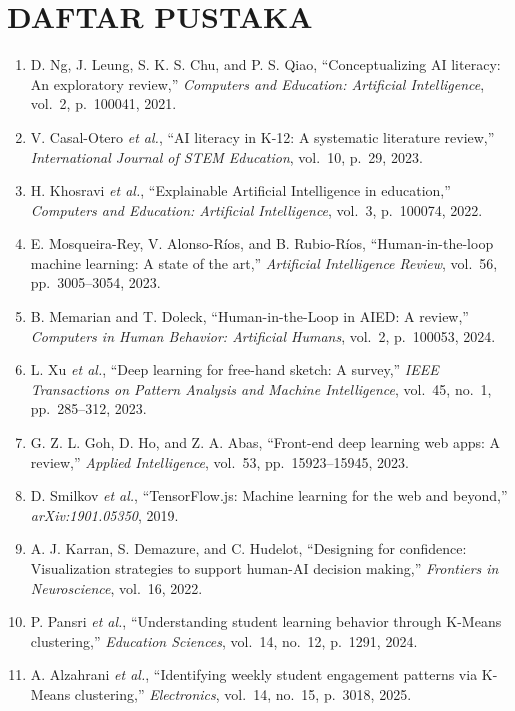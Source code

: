 \documentclass[10pt,twoside,openright]{report}
\begin{document}
\chapter*{DAFTAR PUSTAKA}

\begin{enumerate}
    \item[{[1]}] D. Ng, J. Leung, S. K. S. Chu, and P. S. Qiao, ``Conceptualizing AI literacy: An exploratory review,'' \textit{Computers and Education: Artificial Intelligence}, vol.~2, p.~100041, 2021.
    \item[{[2]}] V. Casal-Otero \textit{et al.}, ``AI literacy in K-12: A systematic literature review,'' \textit{International Journal of STEM Education}, vol.~10, p.~29, 2023.
    \item[{[3]}] H. Khosravi \textit{et al.}, ``Explainable Artificial Intelligence in education,'' \textit{Computers and Education: Artificial Intelligence}, vol.~3, p.~100074, 2022.
    \item[{[4]}] E. Mosqueira-Rey, V. Alonso-Ríos, and B. Rubio-Ríos, ``Human-in-the-loop machine learning: A state of the art,'' \textit{Artificial Intelligence Review}, vol.~56, pp.~3005--3054, 2023.
    \item[{[5]}] B. Memarian and T. Doleck, ``Human-in-the-Loop in AIED: A review,'' \textit{Computers in Human Behavior: Artificial Humans}, vol.~2, p.~100053, 2024.
    \item[{[6]}] L. Xu \textit{et al.}, ``Deep learning for free-hand sketch: A survey,'' \textit{IEEE Transactions on Pattern Analysis and Machine Intelligence}, vol.~45, no.~1, pp.~285--312, 2023.
    \item[{[7]}] G. Z. L. Goh, D. Ho, and Z. A. Abas, ``Front-end deep learning web apps: A review,'' \textit{Applied Intelligence}, vol.~53, pp.~15923--15945, 2023.
    \item[{[8]}] D. Smilkov \textit{et al.}, ``TensorFlow.js: Machine learning for the web and beyond,'' \textit{arXiv:1901.05350}, 2019.
    \item[{[9]}] A. J. Karran, S. Demazure, and C. Hudelot, ``Designing for confidence: Visualization strategies to support human-AI decision making,'' \textit{Frontiers in Neuroscience}, vol.~16, 2022.
    \item[{[10]}] P. Pansri \textit{et al.}, ``Understanding student learning behavior through K-Means clustering,'' \textit{Education Sciences}, vol.~14, no.~12, p.~1291, 2024.
    \item[{[11]}] A. Alzahrani \textit{et al.}, ``Identifying weekly student engagement patterns via K-Means clustering,'' \textit{Electronics}, vol.~14, no.~15, p.~3018, 2025.

\end{enumerate}
\end{document}
